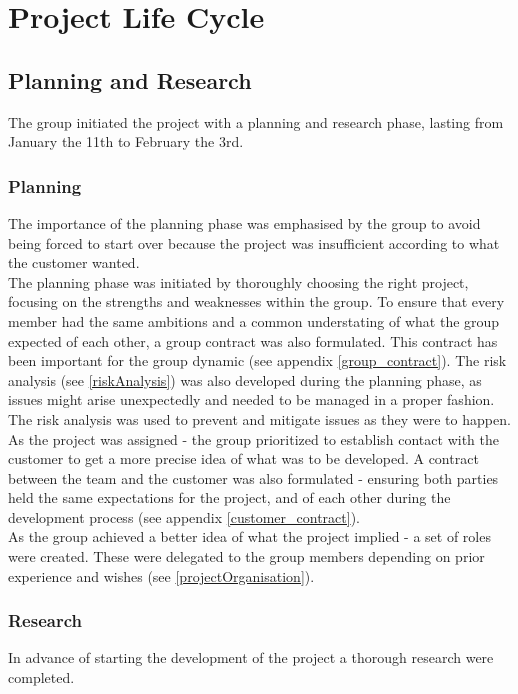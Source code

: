 
\chapter{Project Life Cycle}

\section{Planning and Research}
The group initiated the project with a planning and research phase, lasting from January the 11th to February the 3rd. 

\subsection{Planning}
The importance of the planning phase was emphasised by the group to avoid being forced to start over because the project was insufficient according to what the customer wanted. \\

The planning phase was initiated by thoroughly choosing the right project, focusing on the strengths and weaknesses within the group. To ensure that every member had the same ambitions and a common understating of what the group expected of each other, a group contract was also formulated. This contract has been important for the group dynamic (see appendix \ref{group_contract}). The risk analysis (see \ref{riskAnalysis}) was also developed during the planning phase, as issues might arise unexpectedly and needed to be managed in a proper fashion. The risk analysis was used to prevent and mitigate issues as they were to happen.  \\  

As the project was assigned - the group prioritized to establish contact with the customer to get a more precise idea of what was to be developed. A contract between the team and the customer was also formulated - ensuring both parties held the same expectations for the project, and of each other during the development process (see appendix \ref{customer_contract}).\\

As the group achieved a better idea of what the project implied - a set of roles were created. These were delegated to the group members depending on prior experience and wishes (see \ref{projectOrganisation}).

\subsection{Research}
In advance of starting the development of the project a thorough research were completed.

